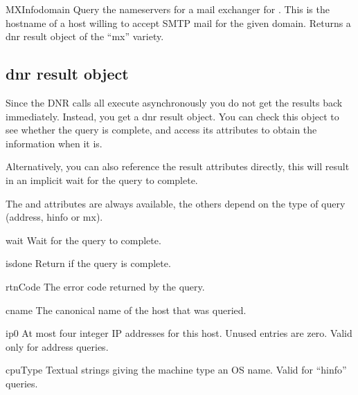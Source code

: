 \begin{funcdesc}{MXInfo}{domain}
Query the nameservers for a mail exchanger for .  This is
the hostname of a host willing to accept SMTP mail for the
given domain.  Returns a dnr result object of the ``mx'' variety.
\end{funcdesc}

\subsection{dnr result object}
\label{dnr-result-object}

Since the DNR calls all execute asynchronously you do not get the
results back immediately.  Instead, you get a dnr result object.  You
can check this object to see whether the query is complete, and access
its attributes to obtain the information when it is.

Alternatively, you can also reference the result attributes directly,
this will result in an implicit wait for the query to complete.

The  and  attributes are always
available, the others depend on the type of query (address, hinfo or
mx).


\begin{methoddesc}{wait}{}
Wait for the query to complete.
\end{methoddesc}

\begin{methoddesc}{isdone}{}
Return  if the query is complete.
\end{methoddesc}


\begin{memberdesc}{rtnCode}
The error code returned by the query.
\end{memberdesc}

\begin{memberdesc}{cname}
The canonical name of the host that was queried.
\end{memberdesc}

\begin{memberdesc}{ip0}
At most four integer IP addresses for this host.  Unused entries are
zero.  Valid only for address queries.
\end{memberdesc}

\begin{memberdesc}{cpuType}
Textual strings giving the machine type an OS name.  Valid for ``hinfo''
queries.
\end{memberdesc}

